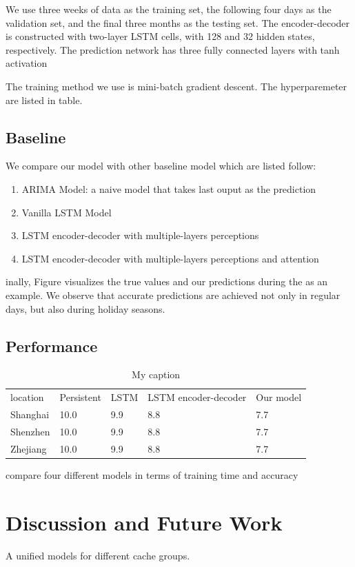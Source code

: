 \documentclass[review]{elsarticle}
\begin{document}
We  use  three  weeks  of  data  as  the  training  set,  the following four  days  as  the  validation  set,  and  the  final three  months  as  the  testing  set.  The  encoder-decoder  is constructed  with  two-layer  LSTM  cells,  with  128  and  32 hidden states, respectively. The prediction network has three fully  connected  layers with tanh activation

The training method we use is mini-batch gradient descent. The hyperparemeter are listed in table.

\subsection{Baseline}
We compare our model with other baseline model which are listed follow:
\begin{enumerate}
  \item ARIMA Model: a naive model that takes last ouput as the prediction
  \item Vanilla LSTM Model
  \item LSTM encoder-decoder with multiple-layers perceptions
  \item LSTM encoder-decoder with multiple-layers perceptions and attention
\end{enumerate}

inally,  Figure   visualizes  the  true  values  and  our predictions during the as an example. We observe that accurate predictions are achieved not only in regular days, but also during holiday seasons.


\subsection{Performance}
\begin{table}[]
\centering
\caption{My caption}
\label{my-label}
\begin{tabular}{lllll}
location & Persistent & LSTM & LSTM encoder-decoder & Our model \\
Shanghai & 10.0       & 9.9  & 8.8                  & 7.7       \\
Shenzhen & 10.0       & 9.9  & 8.8                  & 7.7       \\
Zhejiang & 10.0       & 9.9  & 8.8                  & 7.7      
\end{tabular}
\end{table}

compare four different models in terms of training time and accuracy 

\section{Discussion and Future Work}
A unified models for different cache groups.
\end{document}
